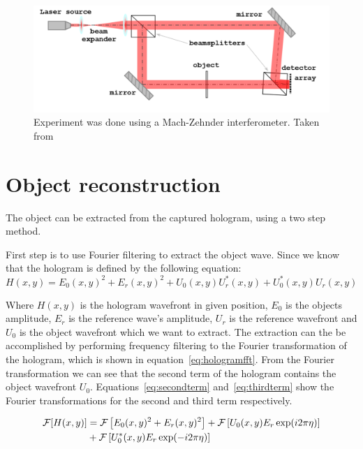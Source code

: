 \documentclass[12pt,a4paper,english
]{tunithesis}
\begin{document}
\begin{figure}
  \centering
  \includegraphics[width=\columnwidth]{img/lab_setup.png}
  \caption{Experiment was done using a Mach-Zehnder interferometer. Taken from~\cite{assignment}}
  \label{fig:lab_setup}
\end{figure}


\section{Object reconstruction}
The object can be extracted from the captured hologram, using a two step method.

First step is to use Fourier filtering to extract the object wave. Since we know that the hologram is defined by the following equation:
\begin{equation}
H(x, y) = E_0(x, y)^2 + E_r(x, y)^2 + U_0(x, y)U_r^*(x, y) + U_0^*(x, y)U_r(x, y)
\label{eq:hologram}
\end{equation}

Where $H(x,y)$ is the hologram wavefront in given position, $E_0$ is the objects amplitude, $E_r$ is the reference wave's amplitude, $U_r$ is the reference wavefront and $U_0$ is the object wavefront which we want to extract. The extraction can the be accomplished by performing frequency filtering to the Fourier transformation of the hologram, which is shown in equation~\ref{eq:hologramfft}. From the Fourier transformation we can see that the second term of the hologram contains the object wavefront $U_0$. Equations~\ref{eq:secondterm} and~\ref{eq:thirdterm} show the Fourier transformations for the second and third term respectively.

\begin{align}
\mathcal{F}[H(x, y)] &= \mathcal{F}\left[E_0(x, y)^2 + E_r(x, y)^2\right] + \mathcal{F}\left[U_0(x, y)E_r \exp(i2\pi\eta)\right] \notag \\
& + \mathcal{F}\left[U_0^*(x, y)E_r \exp(-i2\pi\eta)\right]
\label{eq:hologramfft}
\end{align}
\end{document}
